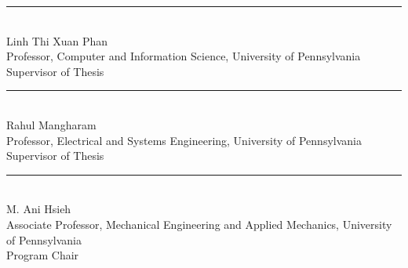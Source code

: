 \begin{titlepage}
  \begin{flushleft}
    \rule{2.5in}{0.4pt}\\[2pt]
    Linh Thi Xuan Phan\\
    Professor, Computer and Information Science, University of Pennsylvania\\
    Supervisor of Thesis
  \end{flushleft}

  \vspace{0.15in}

  \begin{flushleft}
    \rule{2.5in}{0.4pt}\\[2pt]
    Rahul Mangharam\\
    Professor, Electrical and Systems Engineering, University of Pennsylvania\\
    Supervisor of Thesis
  \end{flushleft}

  \vspace{0.15in}

  \begin{flushleft}
    \rule{2.5in}{0.4pt}\\[2pt]
    M. Ani Hsieh\\
    Associate Professor, Mechanical Engineering and Applied Mechanics, University of Pennsylvania\\
    Program Chair
  \end{flushleft}

\end{titlepage}
